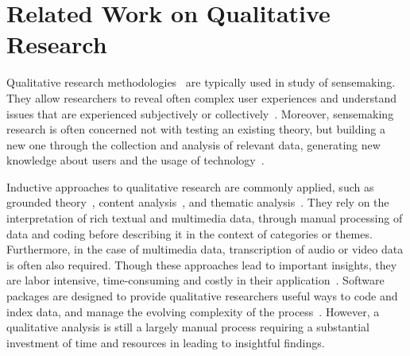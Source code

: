 \section{Related Work on Qualitative Research}
Qualitative research methodologies~\cite{Adams2008} are typically used in study of sensemaking. They allow researchers to reveal often complex user experiences and understand issues that are experienced subjectively or collectively~\cite{Pace2004, Adams2008}. Moreover, sensemaking research is often concerned not with testing an existing theory, but building a new one through the collection and analysis of relevant data, generating new knowledge about users and the usage of technology~\cite{Rogers2012}.

Inductive approaches to qualitative research are commonly applied, such as grounded theory~\cite{Corbin1994}, content analysis~\cite{Stemler2001}, and thematic analysis~\cite{Guest2011}. They rely on the interpretation of rich textual and multimedia data, through manual processing of data and coding before describing it in the context of categories or themes. Furthermore, in the case of multimedia data, transcription of audio or video data is often also required. Though these approaches lead to important insights, they are labor intensive, time-consuming and costly in their application~\cite{Wong2002}. Software packages are designed to provide qualitative researchers useful ways to code and index data, and manage the evolving complexity of the process~\cite{Lewins2007}. However, a qualitative analysis is still a largely manual process requiring a substantial investment of time and resources in leading to insightful findings.


